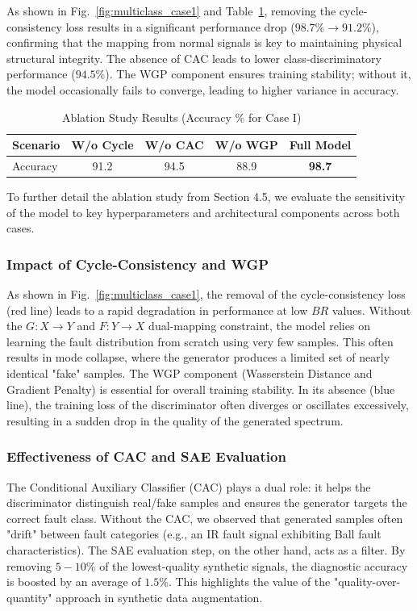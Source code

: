 As shown in Fig.~\ref{fig:multiclass_case1} and Table~\ref{tab:ablation}, removing the cycle-consistency loss results in a significant performance drop ($98.7\% \to 91.2\%$), confirming that the mapping from normal signals is key to maintaining physical structural integrity. The absence of CAC leads to lower class-discriminatory performance ($94.5\%$). The WGP component ensures training stability; without it, the model occasionally fails to converge, leading to higher variance in accuracy.

\begin{table}[htbp]
\centering
\caption{Ablation Study Results (Accuracy \% for Case I)}
\label{tab:ablation}
\begin{tabular}{lcccc}
\hline
\textbf{Scenario} & W/o Cycle & W/o CAC & W/o WGP & \textbf{Full Model} \\ \hline
Accuracy & 91.2 & 94.5 & 88.9 & \textbf{98.7} \\
\hline
\end{tabular}
\end{table}

To further detail the ablation study from Section 4.5, we evaluate the sensitivity of the model to key hyperparameters and architectural components across both cases.

\subsubsection{Impact of Cycle-Consistency and WGP}
As shown in Fig.~\ref{fig:multiclass_case1}, the removal of the cycle-consistency loss (red line) leads to a rapid degradation in performance at low $BR$ values. Without the $G: X \to Y$ and $F: Y \to X$ dual-mapping constraint, the model relies on learning the fault distribution from scratch using very few samples. This often results in mode collapse, where the generator produces a limited set of nearly identical "fake" samples. The WGP component (Wasserstein Distance and Gradient Penalty) is essential for overall training stability. In its absence (blue line), the training loss of the discriminator often diverges or oscillates excessively, resulting in a sudden drop in the quality of the generated spectrum.

\subsubsection{Effectiveness of CAC and SAE Evaluation}
The Conditional Auxiliary Classifier (CAC) plays a dual role: it helps the discriminator distinguish real/fake samples and ensures the generator targets the correct fault class. Without the CAC, we observed that generated samples often "drift" between fault categories (e.g., an IR fault signal exhibiting Ball fault characteristics). The SAE evaluation step, on the other hand, acts as a filter. By removing $5-10\%$ of the lowest-quality synthetic signals, the diagnostic accuracy is boosted by an average of $1.5\%$. This highlights the value of the "quality-over-quantity" approach in synthetic data augmentation.


